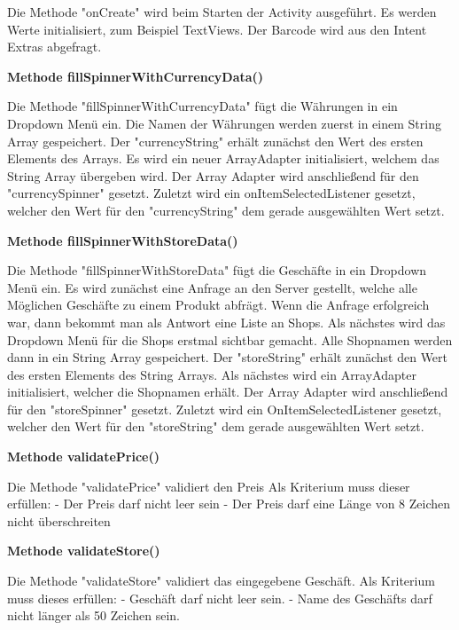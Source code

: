 \documentclass{scrartcl}
\begin{document}
\noindent Die Methode "onCreate" wird beim Starten der Activity ausgeführt. Es werden Werte initialisiert, zum Beispiel TextViews. Der Barcode wird aus den Intent Extras abgefragt. \newline

\noindent\textbf{Methode fillSpinnerWithCurrencyData()}

\noindent Die Methode "fillSpinnerWithCurrencyData" fügt die Währungen in ein Dropdown Menü ein. Die Namen der Währungen werden zuerst in einem String Array gespeichert. Der "currencyString" erhält zunächst den Wert des ersten Elements des Arrays. Es wird ein neuer ArrayAdapter initialisiert, welchem das String Array übergeben wird. Der Array Adapter wird anschließend für den "currencySpinner" gesetzt. Zuletzt wird ein onItemSelectedListener gesetzt, welcher den Wert für den "currencyString" dem gerade ausgewählten Wert setzt. \newline

\noindent\textbf{Methode fillSpinnerWithStoreData()}

\noindent Die Methode "fillSpinnerWithStoreData" fügt die Geschäfte in ein Dropdown Menü ein. Es wird zunächst eine Anfrage an den Server gestellt, welche alle Möglichen Geschäfte zu einem Produkt abfrägt. Wenn die Anfrage erfolgreich war, dann bekommt man als Antwort eine Liste an Shops. Als nächstes wird das Dropdown Menü für die Shops erstmal sichtbar gemacht. Alle Shopnamen werden dann in ein String Array gespeichert. Der "storeString" erhält zunächst den Wert des ersten Elements des String Arrays. Als nächstes wird ein ArrayAdapter initialisiert, welcher die Shopnamen erhält. Der Array Adapter wird anschließend für den "storeSpinner" gesetzt. Zuletzt wird ein OnItemSelectedListener gesetzt, welcher den Wert für den "storeString" dem gerade ausgewählten Wert setzt. \newline

\noindent\textbf{Methode validatePrice()}

\noindent Die Methode "validatePrice" validiert den Preis Als Kriterium muss dieser erfüllen: - Der Preis darf nicht leer sein - Der Preis darf eine Länge von 8 Zeichen nicht überschreiten \newline 

\noindent\textbf{Methode validateStore()}

\noindent Die Methode "validateStore" validiert das eingegebene Geschäft. Als Kriterium muss dieses erfüllen: - Geschäft darf nicht leer sein. - Name des Geschäfts darf nicht länger als 50 Zeichen sein. \newline 
\end{document}
